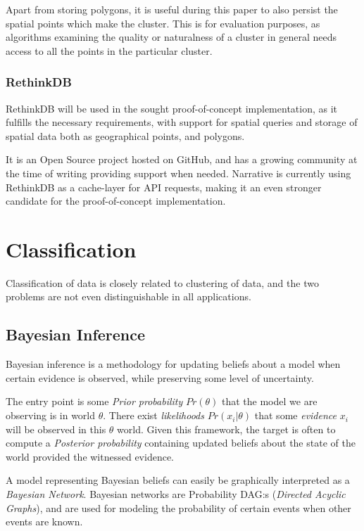 Apart from storing polygons, it is useful during this paper to
also persist the spatial points which make the cluster. This is 
for evaluation purposes, as algorithms examining the quality or
naturalness of a cluster in general needs access to all the points
in the particular cluster.

\subsubsection{RethinkDB}
RethinkDB will be used in the sought proof-of-concept implementation,
as it fulfills the necessary requirements, with support for spatial
queries and storage of spatial data both as geographical points, and
polygons.

It is an Open Source project hosted on GitHub, and has a growing 
community at the time of writing providing support when needed. Narrative
is currently using RethinkDB as a cache-layer for API requests, making
it an even stronger candidate for the proof-of-concept implementation.

\section{Classification}
Classification of data is closely related to clustering of data, 
and the two problems are not even distinguishable in all 
applications. 

\subsection{Bayesian Inference}

Bayesian inference is a methodology for updating beliefs about a model
when certain evidence is observed, while preserving some level of 
uncertainty.

The entry point is some \emph{Prior probability} $Pr(\theta)$ that the model 
we are observing is in world $\theta$. There exist \emph{likelihoods} 
$ Pr(x_i|\theta) $ that some \emph{evidence} $ x_i $ will be observed in
this $\theta$ world. Given this framework, the target is often to 
compute a \emph{Posterior probability} containing updated beliefs about
the state of the world provided the witnessed evidence. 

A model representing Bayesian beliefs can easily be graphically 
interpreted as a \emph{Bayesian Network}. Bayesian networks are Probability 
DAG:s (\emph{Directed Acyclic Graphs}), and are used for modeling the 
probability of certain events when other events are known. 

